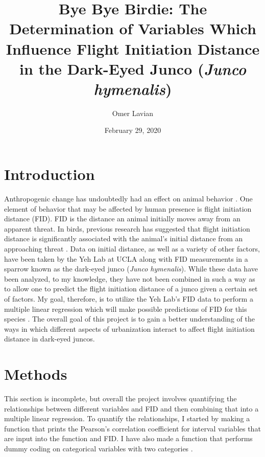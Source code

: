 \documentclass{article}
\title{Bye Bye Birdie: The Determination of Variables Which Influence Flight Initiation Distance in the Dark-Eyed Junco (\textit{Junco hymenalis})}
\author{Omer Lavian}
\date{February 29, 2020}
\begin{document}
\maketitle
\newpage
\tableofcontents

\newpage
\section{Introduction}
\hspace{1 cm} Anthropogenic change has undoubtedly had an effect on animal behavior \cite{wong_behavioral_2015}. One element of behavior that may be affected by human presence is flight initiation distance (FID). FID is the distance an animal initially moves away from an apparent threat. In birds, previous research has suggested that flight initiation distance is significantly associated with the animal's initial distance from an approaching threat \cite{blumstein_flight-initiation_2003}. Data on initial distance, as well as a variety of other factors, have been taken by the Yeh Lab at UCLA along with FID measurements in a sparrow known as the dark-eyed junco (\textit{Junco hymenalis}). While these data have been analyzed, to my knowledge, they have not been combined in such a way as to allow one to predict the flight initiation distance of a junco given a certain set of factors. My goal, therefore, is to utilize the Yeh Lab's FID data to perform a multiple linear regression which will make possible predictions of FID for this species \cite{noauthor_multiple_nodate}. The overall goal of this project is to gain a better understanding of the ways in which different aspects of urbanization interact to affect flight initiation distance in dark-eyed juncos. 
  

\section{Methods}
\hspace{1 cm} This section is incomplete, but overall the project involves quantifying the relationships between different variables and FID and then combining that into a multiple linear regression. To quantify the relationships, I started by making a function that prints the Pearson's correlation coefficient for interval variables that are input into the function and FID. I have also made a function that performs dummy coding on categorical variables with two categories \cite{noauthor_dummy_nodate}.
\end{document}
